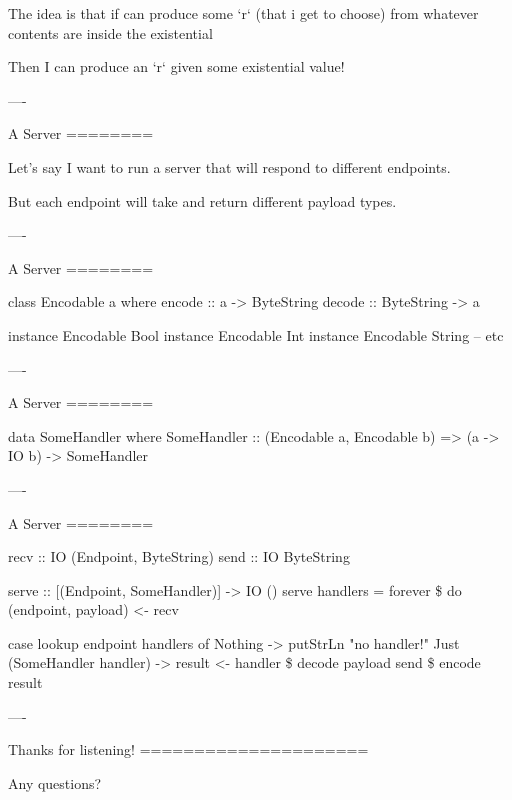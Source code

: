 The idea is that if can produce some `r` (that i get to choose) from whatever contents are inside the existential

Then I can produce an `r` given some existential value!

----

A Server
========

Let's say I want to run a server that will respond to different endpoints.

But each endpoint will take and return different payload types.

----

A Server
========

\begin{hs}
  class Encodable a where
    encode :: a -> ByteString
    decode :: ByteString -> a

  instance Encodable Bool
  instance Encodable Int
  instance Encodable String
  -- etc
\end{hs}

----

A Server
========

\begin{hs}
  data SomeHandler where
    SomeHandler :: (Encodable a, Encodable b)
                => (a -> IO b)
                -> SomeHandler
\end{hs}

----

A Server
========

\begin{hs}
  recv :: IO (Endpoint, ByteString)
  send :: IO ByteString


  serve :: [(Endpoint, SomeHandler)] -> IO ()
  serve handlers = forever \$ do
    (endpoint, payload) <- recv

    case lookup endpoint handlers of
      Nothing -> putStrLn "no handler!"
      Just (SomeHandler handler) ->
        result <- handler \$ decode payload
        send \$ encode result
\end{hs}

----

Thanks for listening!
=====================

Any questions?

